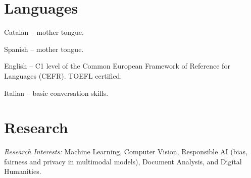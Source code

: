 \documentclass[11pt]{article}
\newenvironment{entries}{%
  \begin{list}{}{\setlength{\leftmargin}{3em}\setlength{\itemindent}{-1.5em}%
    \setlength{\itemsep}{0.35em}\setlength{\parsep}{0pt}\setlength{\topsep}{0.2em}}}%
  {\end{list}}
\begin{document}
\section*{Languages}
\begin{entries}
\item Catalan -- mother tongue.
\item Spanish -- mother tongue.
\item English -- C1 level of the Common European Framework of Reference for Languages (CEFR). TOEFL certified.
\item Italian -- basic conversation skills.
\end{entries}

\section*{Research}
\textit{Research Interests:} Machine Learning, Computer Vision, Responsible AI (bias, fairness and privacy in multimodal models), Document Analysis, and Digital Humanities.
\end{document}
